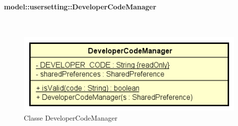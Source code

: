 \documentclass[../DefinizioneDiProdotto.tex]{subfiles}
\begin{document}
\paragraph{model::usersetting::DeveloperCodeManager}
\
\begin{figure}[H]
	\centering
	\includegraphics[width=\maxwidth]{img/DeveloperCodeManager.png}
	\caption{Classe DeveloperCodeManager}\label{fig:model::usersetting::DeveloperCodeManager} 
\end{figure}
\end{document}
